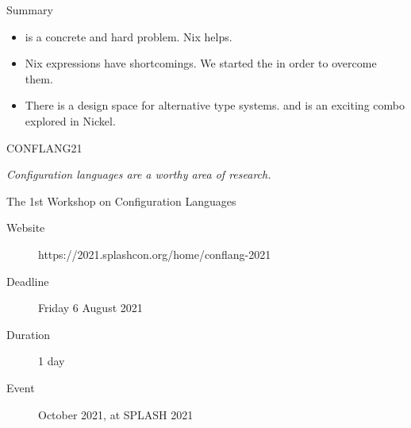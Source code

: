 \documentclass[aspectratio=169]{beamer}
\newcommand{\couleur}[2]{{\color{#1}{#2}}}
\begin{document}
\begin{frame}{Summary}
    \begin{itemize}
        \item \couleur{orange-vivid-tangerine}{Reproducibility} is a concrete
            and hard problem. Nix helps.
        \item Nix expressions have shortcomings. We started the
            \couleur{blue-portage}{Nickel} in order to overcome them.
        \item There is a design space for alternative type systems.
            \couleur{pink-froly}{Gradual typing} and
            \couleur{pink-froly}{first-class contracts} is an
            exciting combo explored in Nickel.
    \end{itemize}
\end{frame}

\begin{frame}{CONFLANG21}

    \begin{center}
        \textit{Configuration languages are a worthy area of research.}
    \end{center}

    The 1st Workshop on Configuration Languages

    \begin{description}
        \item[Website] https://2021.splashcon.org/home/conflang-2021
        \item[Deadline] Friday 6 August 2021
        \item[Duration] 1 day
        \item[Event] October 2021, at SPLASH 2021
    \end{description}
\end{frame}
\end{document}
